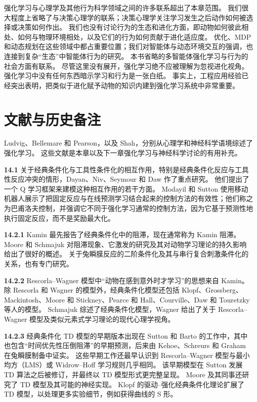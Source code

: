 \documentclass[UTF8,12pt,a4paper,fontset=fandol]{ctexart}
\begin{document}
强化学习与心理学及其他行为科学领域之间的许多联系超出了本章范围。
我们很大程度上省略了与决策心理学的联系；决策心理学关注学习发生之后动作如何被选择或决策如何作出。
我们也没有讨论行为的生态和进化方面，即动物如何彼此相处、如何与物理环境相处，以及它们的行为如何贡献于进化适应度。
优化、MDP 和动态规划在这些领域中都占重要位置；我们对智能体与动态环境交互的强调，也连接到复杂“生态”中智能体行为的研究。
本书省略的多智能体强化学习与行为的社会方面有联系。
尽管这里没有展开，强化学习绝不应被理解为忽视进化视角。
强化学习中没有任何东西暗示学习和行为是一张白纸。
事实上，工程应用经验已经突出表明，把类似于进化赋予动物的知识内建到强化学习系统中非常重要。

\section*{文献与历史备注}

Ludvig、Bellemare 和 Pearson，以及 Shah，分别从心理学和神经科学语境综述了强化学习。
这些文献是本章以及下一章强化学习与神经科学讨论的有用补充。

\noindent\textbf{14.1}
关于经典条件化与工具性条件化的相互作用，特别是经典条件化反应与工具性反应冲突的情形，Dayan、Niv、Seymour 和 Daw 作了重点研究。
他们提出了一个 Q 学习框架来建模这种相互作用的若干方面。
Modayil 和 Sutton 使用移动机器人展示了把固定反应与在线预测学习结合起来的控制方法的有效性；他们称之为巴甫洛夫控制，并强调它不同于强化学习通常的控制方法，因为它基于预测性地执行固定反应，而不是奖励最大化。

\noindent\textbf{14.2.1}
Kamin 最先报告了经典条件化中的阻滞，现在通常称为 Kamin 阻滞。
Moore 和 Schmajuk 对阻滞现象、它激发的研究及其对动物学习理论的持久影响给出了很好的概述。
关于兔瞬膜反应的二阶条件化及其与串行复合刺激条件化的关系，也有专门研究。

\noindent\textbf{14.2.2}
Rescorla--Wagner 模型中“动物在感到意外时才学习”的思想来自 Kamin。
除 Rescorla 和 Wagner 的模型外，经典条件化模型还包括 Klopf、Grossberg、Mackintosh、Moore 和 Stickney、Pearce 和 Hall、Courville、Daw 和 Touretzky 等人的模型。
Schmajuk 综述了经典条件化模型，Wagner 给出了关于 Rescorla--Wagner 模型及类似元素式学习理论的现代心理学视角。

\noindent\textbf{14.2.3}
经典条件化 TD 模型的早期版本出现在 Sutton 和 Barto 的工作中，其中也包含“时间优先性压倒阻滞”的早期预测，后来由 Kehoe、Schreurs 和 Graham 在兔瞬膜制备中证实。
这些早期工作还最早认识到 Rescorla--Wagner 模型与最小均方（LMS）或 Widrow--Hoff 学习规则几乎相同。
该早期模型在 Sutton 发展 TD 算法之后被修订，并最终以 TD 模型形式更完整呈现。
Moore 及其同事还研究了 TD 模型及其可能的神经实现。
Klopf 的驱动--强化经典条件化理论扩展了 TD 模型，以处理更多实验细节，例如获得曲线的 S 形。
\end{document}
